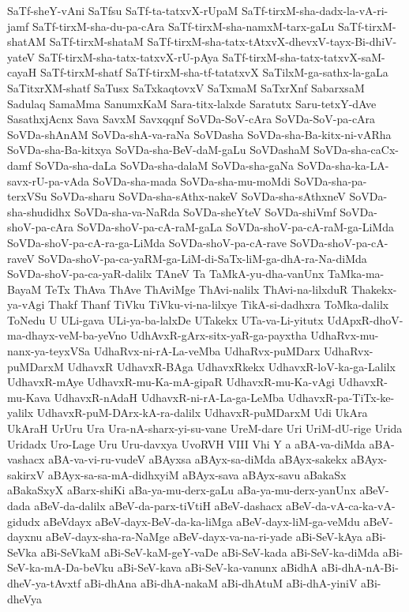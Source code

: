 {SaTf-sheY-vAni
SaTfsu
SaTf-ta-tatxvX-rUpaM
SaTf-tirxM-sha-dadx-la-vA-ri-jamf
SaTf-tirxM-sha-du-pa-cAra
SaTf-tirxM-sha-namxM-tarx-gaLu
SaTf-tirxM-shatAM
SaTf-tirxM-shataM
SaTf-tirxM-sha-tatx-tAtxvX-dhevxV-tayx-Bi-dhiV-yateV
SaTf-tirxM-sha-tatx-tatxvX-rU-pAya
SaTf-tirxM-sha-tatx-tatxvX-saM-cayaH
SaTf-tirxM-shatf
SaTf-tirxM-sha-tf-tatatxvX
SaTilxM-ga-sathx-la-gaLa
SaTitxrXM-shatf
SaTusx
SaTxkaqtovxV
SaTxmaM
SaTxrXnf
SabarxsaM
Sadulaq
SamaMma
SanumxKaM
Sara-titx-lalxde
Saratutx
Saru-tetxY-dAve
SasathxjAcnx
Sava
SavxM
Savxqqnf
SoVDa-SoV-cAra
SoVDa-SoV-pa-cAra
SoVDa-shAnAM
SoVDa-shA-va-raNa
SoVDasha
SoVDa-sha-Ba-kitx-ni-vARha
SoVDa-sha-Ba-kitxya
SoVDa-sha-BeV-daM-gaLu
SoVDashaM
SoVDa-sha-caCx-damf
SoVDa-sha-daLa
SoVDa-sha-dalaM
SoVDa-sha-gaNa
SoVDa-sha-ka-LA-savx-rU-pa-vAda
SoVDa-sha-mada
SoVDa-sha-mu-moMdi
SoVDa-sha-pa-terxVSu
SoVDa-sharu
SoVDa-sha-sAthx-nakeV
SoVDa-sha-sAthxneV
SoVDa-sha-shudidhx
SoVDa-sha-va-NaRda
SoVDa-sheYteV
SoVDa-shiVmf
SoVDa-shoV-pa-cAra
SoVDa-shoV-pa-cA-raM-gaLa
SoVDa-shoV-pa-cA-raM-ga-LiMda
SoVDa-shoV-pa-cA-ra-ga-LiMda
SoVDa-shoV-pa-cA-rave
SoVDa-shoV-pa-cA-raveV
SoVDa-shoV-pa-ca-yaRM-ga-LiM-di-SaTx-liM-ga-dhA-ra-Na-diMda
SoVDa-shoV-pa-ca-yaR-dalilx
TAneV
Ta
TaMkA-yu-dha-vanUnx
TaMka-ma-BayaM
TeTx
ThAva
ThAve
ThAviMge
ThAvi-nalilx
ThAvi-na-lilxduR
Thakekx-ya-vAgi
Thakf
Thanf
TiVku
TiVku-vi-na-lilxye
TikA-si-dadhxra
ToMka-dalilx
ToNedu
U
ULi-gava
ULi-ya-ba-lalxDe
UTakekx
UTa-va-Li-yitutx
UdApxR-dhoV-ma-dhayx-veM-ba-yeVno
UdhAvxR-gArx-sitx-yaR-ga-payxtha
UdhaRvx-mu-nanx-ya-teyxVSa
UdhaRvx-ni-rA-La-veMba
UdhaRvx-puMDarx
UdhaRvx-puMDarxM
UdhavxR
UdhavxR-BAga
UdhavxRkekx
UdhavxR-loV-ka-ga-Lalilx
UdhavxR-mAye
UdhavxR-mu-Ka-mA-gipaR
UdhavxR-mu-Ka-vAgi
UdhavxR-mu-Kava
UdhavxR-nAdaH
UdhavxR-ni-rA-La-ga-LeMba
UdhavxR-pa-TiTx-ke-yalilx
UdhavxR-puM-DArx-kA-ra-dalilx
UdhavxR-puMDarxM
Udi
UkAra
UkAraH
UrUru
Ura
Ura-nA-sharx-yi-su-vane
UreM-dare
Uri
UriM-dU-rige
Urida
Uridadx
Uro-Lage
Uru
Uru-davxya
UvoRVH
VIII
Vhi
Y
a
aBA-va-diMda
aBA-vashacx
aBA-va-vi-ru-vudeV
aBAyxsa
aBAyx-sa-diMda
aBAyx-sakekx
aBAyx-sakirxV
aBAyx-sa-sa-mA-didhxyiM
aBAyx-sava
aBAyx-savu
aBakaSx
aBakaSxyX
aBarx-shiKi
aBa-ya-mu-derx-gaLu
aBa-ya-mu-derx-yanUnx
aBeV-dada
aBeV-da-dalilx
aBeV-da-parx-tiVtiH
aBeV-dashacx
aBeV-da-vA-ca-ka-vA-gidudx
aBeVdayx
aBeV-dayx-BeV-da-ka-liMga
aBeV-dayx-liM-ga-veMdu
aBeV-dayxnu
aBeV-dayx-sha-ra-NaMge
aBeV-dayx-va-na-ri-yade
aBi-SeV-kAya
aBi-SeVka
aBi-SeVkaM
aBi-SeV-kaM-geY-vaDe
aBi-SeV-kada
aBi-SeV-ka-diMda
aBi-SeV-ka-mA-Da-beVku
aBi-SeV-kava
aBi-SeV-ka-vanunx
aBidhA
aBi-dhA-nA-Bi-dheV-ya-tAvxtf
aBi-dhAna
aBi-dhA-nakaM
aBi-dhAtuM
aBi-dhA-yiniV
aBi-dheVya
}
